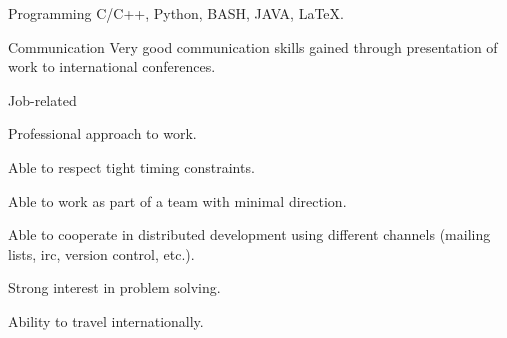 \begin{cvskills}

  \cvskill
    {Programming} %
    {C/C++, Python, BASH, JAVA, LaTeX.} %

  \cvskill
    {Communication} %
    {Very good communication skills gained through presentation of work
	to international conferences.} %

  \cvskill
    {Job-related} %
    {
      \begin{cvitems} %
        \item {Professional approach to work.}
        \item {Able to respect tight timing constraints.}
        \item {Able to work as part of a team with minimal direction.}
        \item {Able to cooperate in distributed development using different channels
		(mailing lists, irc, version control, etc.).}
        \item {Strong interest in problem solving.}
        \item {Ability to travel internationally.}
      \end{cvitems}
    }

\end{cvskills}

